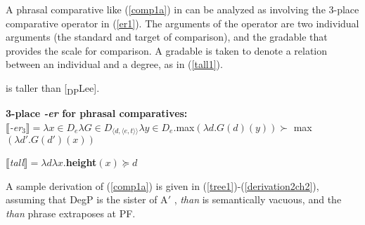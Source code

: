 \documentclass[output=paper,
modfonts
]{langscibook}
\begin{document}
A phrasal comparative like (\ref{comp1a}) in  can be analyzed as involving the 3-place comparative operator in (\ref{er1}). The arguments of the operator are two individual arguments (the standard and target of comparison), and the gradable  that provides the scale for comparison. A gradable  is taken to denote a relation between an individual and a degree, as in (\ref{tall1}).



\begin{exe}
\ex\label{comp1a} 
 is taller than [\textsubscript{DP}Lee]. %

\ex\label{er1}

{\bf 3-place \textit{-er} for phrasal comparatives:} \\
$\llbracket${\it-er}$_3\rrbracket =  \lambda x \in D_{e}\lambda G \in D_{\langle d, \langle e,t \rangle\rangle}\lambda y \in D_{e}.$max$(\lambda d.G(d)(y))\succ$ max $(\lambda d'.G(d')(x))$


\ex\label{tall1}
$\llbracket${\it tall}$\rrbracket = \lambda d\lambda x.${\bf height}$(x) \succeq d$ \hfill \citep{cresswell76semantics, kennedy05scale}

\end{exe}


A sample derivation of (\ref{comp1a}) is given in (\ref{tree1})-(\ref{derivation2ch2}), assuming that DegP is the sister of A$'$ \citep{heim01degree}, {\it than} is semantically vacuous, and the {\it than} phrase extraposes at PF.



\begin{exe}
\ex\label{tree1}
\end{exe}
\end{document}
